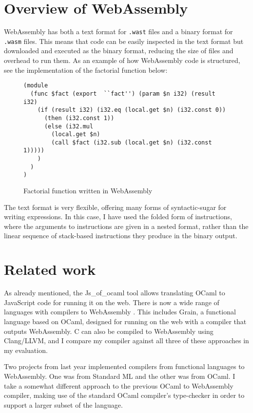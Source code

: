 \section{Overview of WebAssembly}
WebAssembly has both a text format for \verb|.wast| files and a binary format for \verb|.wasm| files. This means that code can be easily inspected in the text format but downloaded and executed as the binary format, reducing the size of files and overhead to run them. As an example of how WebAssembly code is structured, see the implementation of the factorial function below:

\begin{figure}[H]
\begin{verbatim}
(module
  (func $fact (export  ``fact'') (param $n i32) (result i32)
    (if (result i32) (i32.eq (local.get $n) (i32.const 0))
      (then (i32.const 1))
      (else (i32.mul 
        (local.get $n) 
        (call $fact (i32.sub (local.get $n) (i32.const 1)))))
    )
  )
)
\end{verbatim}
\caption{Factorial function written in WebAssembly} 
\end{figure}

The text format is very flexible, offering many forms of syntactic-sugar for writing expressions. In this case, I have used the folded form of instructions, where the arguments to instructions are given in a nested format, rather than the linear sequence of stack-based instructions they produce in the binary output. 


\section{Related work}
As already mentioned, the Js\_of\_ocaml tool allows translating OCaml to JavaScript code for running it on the web. There is now a wide range of languages with compilers to WebAssembly \cite{langauges-to-wasm}. This includes Grain, a functional language based on OCaml, designed for running on the web with a compiler that outputs WebAssembly. C can also be compiled to WebAssembly using Clang/LLVM, and I compare my compiler against all three of these approaches in my evaluation.

Two projects from last year implemented compilers from functional languages to WebAssembly. One was from Standard ML and the other was from OCaml. I take a somewhat different approach to the previous OCaml to WebAssembly compiler, making use of the standard OCaml compiler's type-checker in order to support a larger subset of the language.
